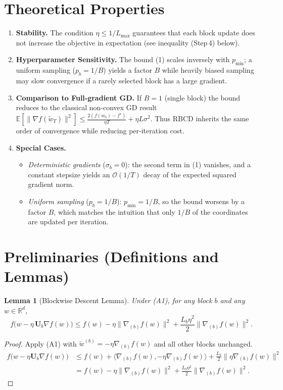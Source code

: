 \documentclass{article}
\newtheorem{lemma}{Lemma}
\newcommand{\E}{\mathbb{E}}
\newcommand{\R}{\mathbb{R}}
\begin{document}
\section*{Theoretical Properties}
\begin{enumerate}[label=\textbf{P\arabic*}:, leftmargin=*]
\item \textbf{Stability.}  
The condition $\eta\le 1/L_{\max}$ guarantees that each block update
does not increase the objective in expectation (see inequality (Step 4) below).

\item \textbf{Hyperparameter Sensitivity.}  
The bound (1) scales inversely with $p_{\min}$; a uniform sampling
($p_b=1/B$) yields a factor $B$ while heavily biased sampling may
slow convergence if a rarely selected block has a large gradient.

\item \textbf{Comparison to Full‑gradient GD.}  
If $B=1$ (single block) the bound reduces to the classical
non‑convex GD result $\E[\|\nabla f(\tilde w_T)\|^2]\le
\frac{2(f(w_0)-f^\star)}{\eta T}+ \eta L\sigma^2$.
Thus RBCD inherits the same order of convergence while reducing per‑iteration cost.

\item \textbf{Special Cases.}
\begin{itemize}
\item \emph{Deterministic gradients} ($\sigma_b=0$): the second term in (1) vanishes,
and a constant stepsize yields an $\mathcal O(1/T)$ decay of the expected squared gradient norm.
\item \emph{Uniform sampling} ($p_b=1/B$): $p_{\min}=1/B$, so the bound worsens by a factor $B$,
which matches the intuition that only $1/B$ of the coordinates are updated per iteration.
\end{itemize}
\end{enumerate}

\section*{Preliminaries (Definitions and Lemmas)}
\begin{lemma}[Blockwise Descent Lemma]\label{lem:descent}
Under (A1), for any block $b$ and any $w\in\R^{d}$,
\[
f\big(w - \eta\,\mathbf{U}_{b}\nabla f(w)\big)
\le f(w) - \eta\|\nabla_{(b)}f(w)\|^2
+ \frac{L_b\eta^{2}}{2}\|\nabla_{(b)}f(w)\|^2 .
\tag{2}
\]
\end{lemma}
\begin{proof}
Apply (A1) with $\tilde w^{(b)} = -\eta \nabla_{(b)}f(w)$ and all other blocks unchanged.
\[
\begin{aligned}
f\big(w-\eta\mathbf{U}_{b}\nabla f(w)\big)
&\le f(w)+\langle\nabla_{(b)}f(w),-\eta\nabla_{(b)}f(w)\rangle
+\frac{L_b}{2}\|\eta\nabla_{(b)}f(w)\|^{2}\\
&= f(w)-\eta\|\nabla_{(b)}f(w)\|^{2}
+\frac{L_b\eta^{2}}{2}\|\nabla_{(b)}f(w)\|^{2}.
\end{aligned}
\]
\end{proof}
\end{document}
